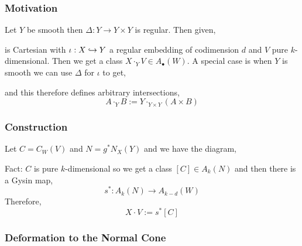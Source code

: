 \documentclass[12pt]{article}
\begin{document}
\subsubsection{Motivation}

Let $Y$ be smooth then $\Delta : Y \to Y \times Y$ is regular. Then given,
\begin{center}
\end{center}
is Cartesian with $\iota : X \hookrightarrow Y$ a regular embedding of codimension $d$ and $V$ pure $k$-dimensional. Then we get a class $X \cdot_Y V \in A_\bullet(W)$. A special case is when $Y$ is smooth we can use $\Delta$ for $\iota$ to get,
\begin{center}
\end{center}
and this therefore defines arbitrary intersections,
\[ A \cdot_Y B := Y \cdot_{Y \times Y} (A \times B) \]

\subsubsection{Construction}

Let $C = C_W(V)$ and $N = g^* N_X(Y)$ and we have the diagram,
\begin{center}
\end{center}
Fact: $C$ is pure $k$-dimensional so we get a class $[C] \in A_k(N)$ and then there is a Gysin map,
\[ s^* : A_k(N) \to A_{k-d}(W) \]
Therefore,
\[ X \cdot V := s^* [C] \]

\subsubsection{Deformation to the Normal Cone}
\end{document}
